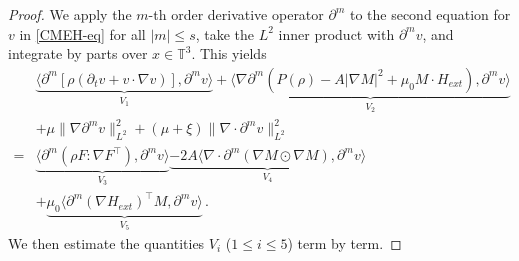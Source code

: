 \documentclass[reqno,11pt]{amsart}
\numberwithin{equation}{section}
\def\p{\partial}
\begin{document}
\begin{proof}

We apply the $m$-th order derivative operator $\partial^m$ to the second equation for $v$ in \eqref{CMEH-eq} for all $|m| \leq s$, take the $L^2$ inner product with $\partial^{m} v$, and integrate by parts over $x \in \mathbb{T}^3$. This yields
\begin{equation}\label{v-eq0}
	\begin{aligned}
&\underset{V_1}{\underbrace{\langle	\p^m[\rho (\p_t v + v \cdot \nabla v)],\p^m v\rangle}} + \underset{V_2}{\underbrace{\langle \nabla \p^m \left( P(\rho) - A |\nabla M|^2 + \mu_0 M \cdot H_{ext} \right),\p^m v\rangle }} \\
    & + \mu\|\nabla \p^m v\|^2_{L^2}+(\mu+\xi)\|\nabla \cdot\p^m v\|^2_{L^2}\\
	= & \underset{V_3}{\underbrace{\langle \p^m(\rho F:\nabla F^\top),\p^m v\rangle}}\underset{V_4}{\underbrace{-2A\langle \nabla \cdot\p^m ( \nabla M \odot \nabla M) ,\p^mv \rangle}} \\
    & + \underset{V_5}{\underbrace{\mu_0\langle  \p^m(\nabla H_{ext})^\top M,\p^mv \rangle	}}
	\,.
	\end{aligned}
\end{equation}
We then estimate the quantities $V_i$ ($1 \leq i \leq 5$) term by term.


\end{proof}
\end{document}
